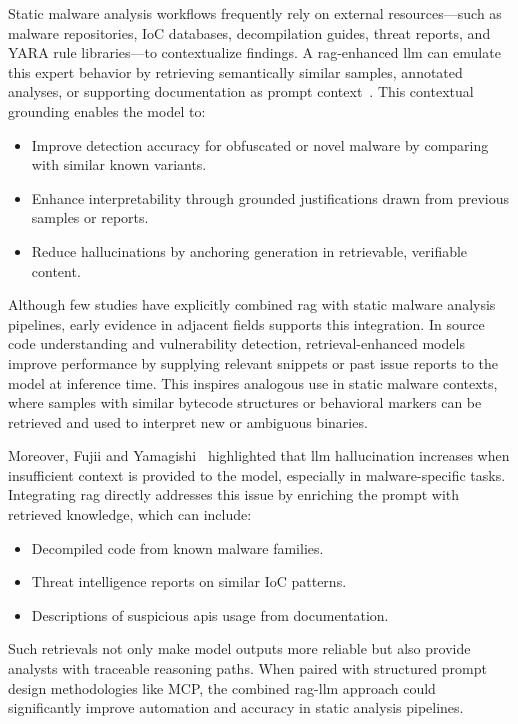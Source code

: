 Static malware analysis workflows frequently rely on external resources—such as malware
repositories, IoC databases, \gls{decompilation} guides, threat reports, and YARA rule libraries—to
contextualize findings. A \gls{rag}-enhanced \gls{llm} can emulate this expert behavior by
retrieving semantically similar samples, annotated analyses, or supporting documentation as prompt
context~\cite{lewis2020retrieval, gao2023retrieval}. This contextual grounding enables the model
to:
\begin{itemize}
	\item Improve detection accuracy for obfuscated or novel malware by comparing with similar known
	      variants.
	\item Enhance interpretability through grounded justifications drawn from previous samples or reports.
	\item Reduce hallucinations by anchoring generation in retrievable, verifiable content.
\end{itemize}

Although few studies have explicitly combined \gls{rag} with static malware analysis pipelines,
early evidence in adjacent fields supports this integration. In source code understanding and
vulnerability detection, retrieval-enhanced models improve performance by supplying relevant
snippets or past issue reports to the model at inference time. This inspires analogous use in
static malware contexts, where samples with similar bytecode structures or behavioral markers can
be retrieved and used to interpret new or ambiguous binaries.

Moreover, Fujii and Yamagishi~\cite{fujii2024llm} highlighted that \gls{llm} hallucination
increases when insufficient context is provided to the model, especially in malware-specific tasks.
Integrating \gls{rag} directly addresses this issue by enriching the prompt with retrieved
knowledge, which can include:
\begin{itemize}
	\item Decompiled code from known malware families.
	\item Threat intelligence reports on similar IoC patterns.
	\item Descriptions of suspicious \glspl{api} usage from documentation.
\end{itemize}

Such retrievals not only make model outputs more reliable but also provide analysts with traceable
reasoning paths. When paired with structured prompt design methodologies like MCP, the combined
\gls{rag}-\gls{llm} approach could significantly improve automation and accuracy in static analysis
pipelines.

